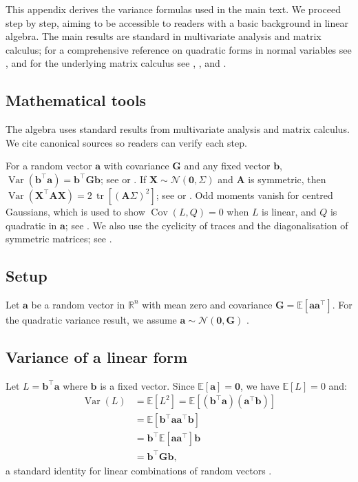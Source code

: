 \documentclass[9pt,twocolumn,twoside,lineno]{gsajnl}
\newcommand{\vect}[1]{\boldsymbol{#1}}
\newcommand{\mat}[1]{\mathbf{#1}}
\newcommand{\RR}{\ensuremath{\mathbb{R}}\xspace}
\newcommand{\E}{\ensuremath{\mathbb{E}}\xspace}
\newcommand{\tr}{\ensuremath{\operatorname{tr}}\xspace}
\newcommand{\Var}{\ensuremath{\operatorname{Var}}\xspace}
\newcommand{\Cov}{\ensuremath{\operatorname{Cov}}\xspace}
\begin{document}

This appendix derives the variance formulas used in the main text. We proceed step by step, aiming to be accessible to readers with a basic background in linear algebra. The main results are standard in multivariate analysis and matrix calculus; for a comprehensive reference on quadratic forms in normal variables see \citet{MathaiProvost1992}, and for the underlying matrix calculus see \citet{Anderson2003}, \citet{Mardia1979}, and \citet{MagnusNeudecker1988}.

\subsection{Mathematical tools}

The algebra uses standard results from multivariate analysis and matrix calculus. We cite canonical sources so readers can verify each step.

For a random vector $\vect{a}$ with covariance $\mat{G}$ and any fixed vector $\vect{b}$, $\Var(\vect{b}^\top\vect{a})=\vect{b}^\top\mat{G}\vect{b}$; see \citet{Anderson2003} or \citet{Mardia1979}. If $\vect{X}\sim\mathcal{N}(\vect{0},\Sigma)$ and $\mat{A}$ is symmetric, then $\Var(\vect{X}^\top\mat{A}\vect{X})=2\,\tr[(\mat{A}\Sigma)^2]$; see \citet{MagnusNeudecker1988} or \citet{Mardia1979}. Odd moments vanish for centred Gaussians, which is used to show $\Cov(L,Q)=0$ when $L$ is linear, and $Q$ is quadratic in $\vect{a}$; see \citet{Mardia1979}. We also use the cyclicity of traces and the diagonalisation of symmetric matrices; see \citet{HornJohnson2012}.

\subsection{Setup}

Let $\vect{a}$ be a random vector in $\RR^n$ with mean zero and covariance $\mat{G} = \E[\vect{a}\vect{a}^\top]$. For the quadratic variance result, we assume $\vect{a} \sim \mathcal{N}(\vect{0}, \mat{G})$ \citep{Anderson2003}.

\subsection{Variance of a linear form}

Let $L = \vect{b}^\top \vect{a}$ where $\vect{b}$ is a fixed vector. Since $\E[\vect{a}] = \vect{0}$, we have $\E[L] = 0$ and:
\begin{align}
\Var(L) &= \E[L^2] = \E[(\vect{b}^\top \vect{a})(\vect{a}^\top \vect{b})] \\
&= \E[\vect{b}^\top \vect{a}\vect{a}^\top \vect{b}] \\
&= \vect{b}^\top \E[\vect{a}\vect{a}^\top] \vect{b} \\
&= \vect{b}^\top \mat{G} \vect{b},
\end{align}
a standard identity for linear combinations of random vectors \citep{Anderson2003,Mardia1979}.
\end{document}
